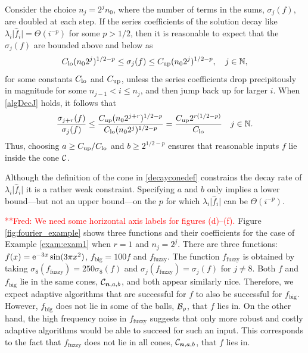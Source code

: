 \documentclass[graybox,footinfo]{svmult}
\newcommand{\DHJRbigabs}[1]{\ensuremath{{\bigl \lvert #1 \bigr \rvert}}}
\newcommand{\frednote}[1]{  {\textcolor{red}  {\mbox{**Fred:} #1}}}
\begin{document}
Consider the choice 
$n_j = 2^{j}n_0$,
where the number of terms in the sums, $\sigma_j(f)$, are doubled at each step.  If the series coefficients of the solution decay like $\lambda_{i} \DHJRbigabs{\widehat{f}_{i}} = \Theta(i^{-p})$ for some $p>1/2$, then it is reasonable to expect that the $\sigma_j(f)$ are bounded above and below as
\begin{equation} \label{algDecJ}
C_{\textup{lo}} (n_02^j)^{1/2-p} \le \sigma_j(f) \le C_{\textup{up}} (n_02^j)^{1/2-p}, \quad   j \in \bbN,
\end{equation}
for some constants $C_{\textup{lo}}$ and $C_{\textup{up}}$, unless the series coefficients drop precipitously in magnitude for some $n_{j-1} < i \le n_j$, and then jump back up for larger $i$.  When \eqref{algDecJ} holds, it follows that
\begin{equation*} 
\frac{\sigma_{j+r}(f)}{\sigma_j(f)} \le \frac{C_{\textup{up}} (n_02^{j+r})^{1/2-p}}{C_{\textup{lo}} (n_02^j)^{1/2-p}} = \frac{C_{\textup{up}} 2^{r(1/2-p)}}{C_{\textup{lo}}}\quad   j \in {\mathbb{N}}.
\end{equation*}
Thus, choosing $a \ge C_{\textup{up}}/C_{\textup{lo}}$ and $b \ge 2^{1/2-p}$ ensures that reasonable inputs $f$ lie inside the cone ${\mathcal{C}}$.

Although the definition of the cone in \eqref{decayconedef} constrains the decay rate of $\lambda_{i} \DHJRbigabs{\widehat{f}_{i}}$ it is a rather weak constraint.  Specifying $a$ and $b$ only implies a lower bound---but not an upper bound---on the $p$ for which $\lambda_{i} \DHJRbigabs{\widehat{f}_{i}}$ can be $\Theta(i^{-p})$.

\frednote{We need some horizontal axis labels for figures (d)--(f).} Figure \ref{fig:fourier_example} shows three functions and their coefficients for the case of Example \ref{exam:exam1} when $r=1$ and $n_j=2^j$. There are three functions: $f(x)={\rm e}^{-3x}\sin(3\pi x^2)$, $f_{\text{big}}=100f$ and $f_{\text{fuzzy}}$. The function $f_{\text{fuzzy}}$ is obtained by taking $\sigma_8(f_{\text{fuzzy}})=250\sigma_8(f)$ and $\sigma_j(f_{\text{fuzzy}})=\sigma_j(f)$ for $j \ne 8$.  Both $f$ and $f_{\text{big}}$ lie in the same cones, ${\mathcal{C}}_{{\boldsymbol{n}},a,b}$, and both appear similarly nice.  Therefore, we expect adaptive algorithms that are successful for $f$ to also be successful for $f_{\text{big}}$. However, $f_{\text{big}}$ does not lie in some of the balls,  ${\mathcal{B}}_{\rho}$, that $f$ lies in.  On the other hand, the high frequency noise in $f_{\text{fuzzy}}$ suggests that only more robust and costly adaptive algorithms would be able to succeed for such an input.  This corresponds to the fact that $f_{\text{fuzzy}}$ does not lie in all cones, ${\mathcal{C}}_{{\boldsymbol{n}},a,b}$, that $f$ lies in.
\end{document}

